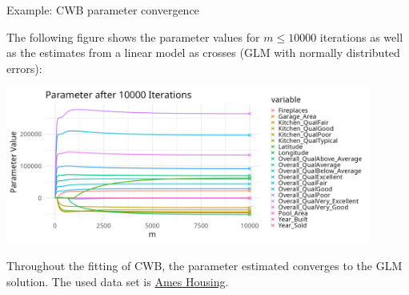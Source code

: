 \documentclass[11pt,compress,t,notes=noshow, xcolor=table]{beamer}
\begin{document}
\begin{vbframe}{Example: CWB parameter convergence}

The following figure shows the parameter values for $m \leq 10000$ iterations as well as the estimates from a linear model as crosses (GLM with normally distributed errors):

\begin{center}
\includegraphics[width=0.9\textwidth]{figure/compboost-to-glm-iter10000.png}
\end{center}

Throughout the fitting of CWB, the parameter estimated converges to the GLM solution. The used data set is \href{https://github.com/topepo/AmesHousing}{Ames Housing}.

\end{vbframe}


\endlecture
\end{document}
